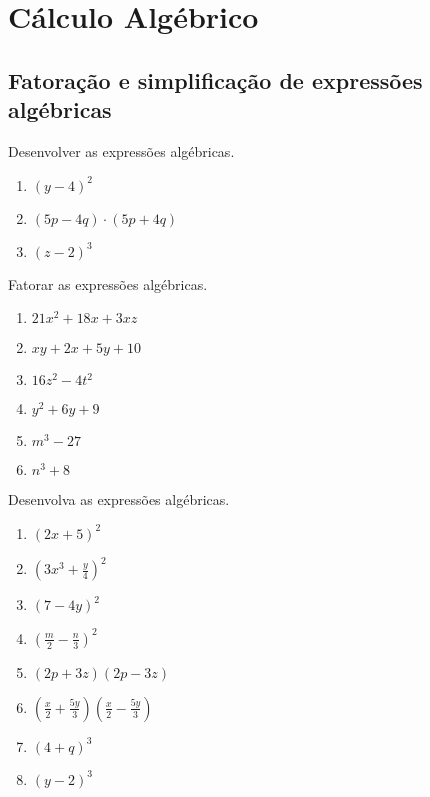 \chapter{Cálculo Algébrico}
\section{Fatoração e simplificação de expressões algébricas}

\item Desenvolver as expressões algébricas.
	\begin{multicols}{3}
	 \begin{enumerate}
	 	\item $(y-4)^2$
	 	\item $(5p-4q)\cdot (5p+4q)$
	 	\item $(z-2)^3$
	 \end{enumerate}
	 \end{multicols}
	 \item Fatorar as expressões algébricas.
	 \begin{multicols}{3}
	 \begin{enumerate}
	 	\item $21x^2+18x+3xz$
	 	\item $xy +2x+ 5y+ 10$
	 	\item $16z^2 - 4t^2$
	 	\item $y^2 + 6y +9$
	 	\item $m^3 - 27$
	 	\item $n^3+8$
	 \end{enumerate}
	 \end{multicols}
	 \item Desenvolva as expressões algébricas.
	\begin{multicols}{2}	 
	 \begin{enumerate}
	 	\item $(2x+ 5)^2$
	 	\item $\left(3x^3 + \displaystyle\frac{y}{4}\right)^2$
	 	\item $(7 - 4y)^2$
	 	\item $\left(\displaystyle\frac{m}{2} - \frac{n}{3}\right)^2$
	 	\item $(2p+3z)(2p-3z)$
	 	\item $\left(\displaystyle\frac{x}{2} + \frac{5y}{3}\right)\left(\displaystyle\frac{x}{2} - \frac{5y}{3}\right)$
	 	\item $(4+q)^3$
	 	\item $(y-2)^3$
	 \end{enumerate}
	 \end{multicols}
